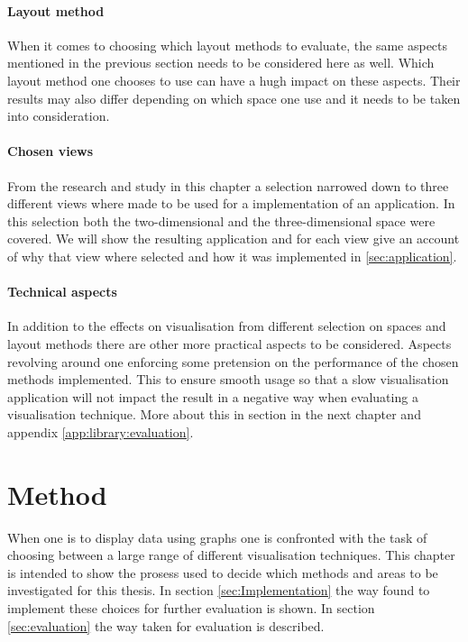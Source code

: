\documentclass[a4paper,11pt]{kth-mag}
\begin{document}
\subsubsection{Layout method}
When it comes to choosing which layout methods to evaluate, the same aspects mentioned in the previous section needs to be considered here as well. Which layout method one chooses to use can have a hugh 
impact on these aspects. Their results may also differ depending on which space one use and it needs to be taken into consideration.
 
\subsubsection{Chosen views}
\label{chosen-views}
From the research and study in this chapter a selection narrowed down to three different views where made to be used for a implementation of an application. In this selection both the two-dimensional and the 
three-dimensional space were covered. We will show the resulting application and for each view give an account of why that view where selected and how it was implemented in \ref{sec:application}.

\subsubsection{Technical aspects}
In addition to the effects on visualisation from different selection on spaces and layout methods there are other more practical aspects to be considered. Aspects revolving around one enforcing some pretension
 on the performance of the chosen methods implemented. This to ensure smooth usage so that a slow visualisation application will not impact the result in a negative way when evaluating a visualisation technique.
 More about this in section in the next chapter and appendix \ref{app:library:evaluation}.
 
\chapter{Method}
\label{chap:three}
When one is to display data using graphs one is confronted with the task of choosing between a large range of different visualisation techniques.
This chapter is intended to show the prosess used to decide which methods and areas to be investigated for this thesis. In section \ref{sec:Implementation} 
the way found to implement these choices for further evaluation is shown. In section \ref{sec:evaluation} the way taken for evaluation is described.
\end{document}
